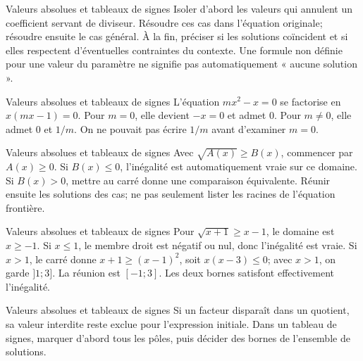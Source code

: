 \documentclass[aspectratio=169,10pt]{beamer}
\begin{document}
\begin{frame}{Valeurs absolues et tableaux de signes}
Isoler d’abord les valeurs qui annulent un coefficient servant de diviseur. Résoudre ces cas dans l’équation originale; résoudre ensuite le cas général. À la fin, préciser si les solutions coïncident et si elles respectent d’éventuelles contraintes du contexte. Une formule non définie pour une valeur du paramètre ne signifie pas automatiquement « aucune solution ».
\end{frame}
\begin{frame}{Valeurs absolues et tableaux de signes}
L’équation \(mx^2-x=0\) se factorise en \(x(mx-1)=0\). Pour \(m=0\), elle devient \(-x=0\) et admet \(0\). Pour \(m\ne0\), elle admet \(0\) et \(1/m\). On ne pouvait pas écrire \(1/m\) avant d’examiner \(m=0\).
\end{frame}
\begin{frame}{Valeurs absolues et tableaux de signes}
Avec \(\sqrt{A(x)}\ge B(x)\), commencer par \(A(x)\ge0\). Si \(B(x)\le0\), l’inégalité est automatiquement vraie sur ce domaine. Si \(B(x)>0\), mettre au carré donne une comparaison équivalente. Réunir ensuite les solutions des cas; ne pas seulement lister les racines de l’équation frontière.
\end{frame}
\begin{frame}{Valeurs absolues et tableaux de signes}
Pour \(\sqrt{x+1}\ge x-1\), le domaine est \(x\ge-1\). Si \(x\le1\), le membre droit est négatif ou nul, donc l’inégalité est vraie. Si \(x>1\), le carré donne \(x+1\ge(x-1)^2\), soit \(x(x-3)\le0\); avec \(x>1\), on garde \(]1;3]\). La réunion est \([-1;3]\). Les deux bornes satisfont effectivement l’inégalité.
\end{frame}
\begin{frame}{Valeurs absolues et tableaux de signes}
Si un facteur disparaît dans un quotient, sa valeur interdite reste exclue pour l’expression initiale. Dans un tableau de signes, marquer d’abord tous les pôles, puis décider des bornes de l’ensemble de solutions.
\end{frame}
\end{document}
